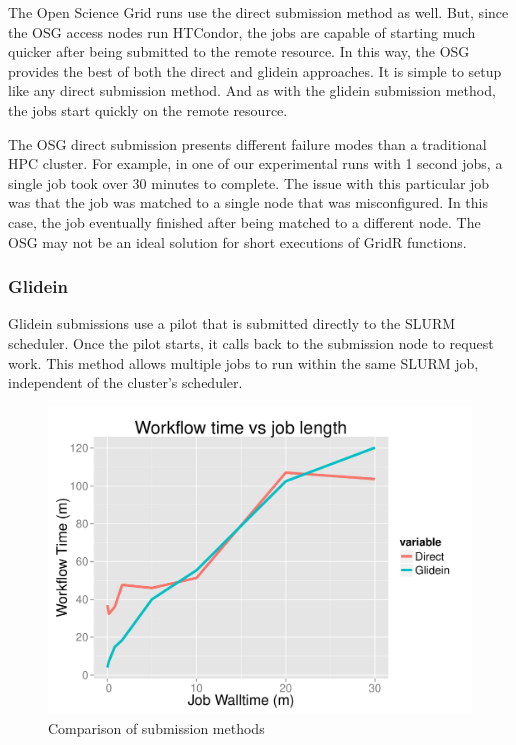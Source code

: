 The Open Science Grid runs use the direct submission method as well.  But, since the OSG access nodes run HTCondor, the jobs are capable of starting much quicker after being submitted to the remote resource.  In this way, the OSG provides the best of both the direct and glidein approaches.  It is simple to setup like any direct submission method.  And as with the glidein submission method, the jobs start quickly on the remote resource.

The OSG direct submission presents different failure modes than a traditional HPC cluster.  For example, in one of our experimental runs with 1 second jobs, a single job took over 30 minutes to complete.  The issue with this particular job was that the job was matched to a single node that was misconfigured.  In this case, the job eventually finished after being matched to a different node.  The OSG may not be an ideal solution for short executions of GridR functions.

\subsubsection{Glidein}
Glidein submissions use a pilot that is submitted directly to the SLURM scheduler.  Once the pilot starts, it calls back to the submission node to request work.  This method allows multiple jobs to run within the same SLURM job, independent of the cluster's scheduler.  

\begin{figure}[ht!]
\centering
\includegraphics[width=\textwidth]{BoscoRImages/ComparisonPlot.pdf}
\caption{Comparison of submission methods}
\label{fig:comparesubmit}
\end{figure}

